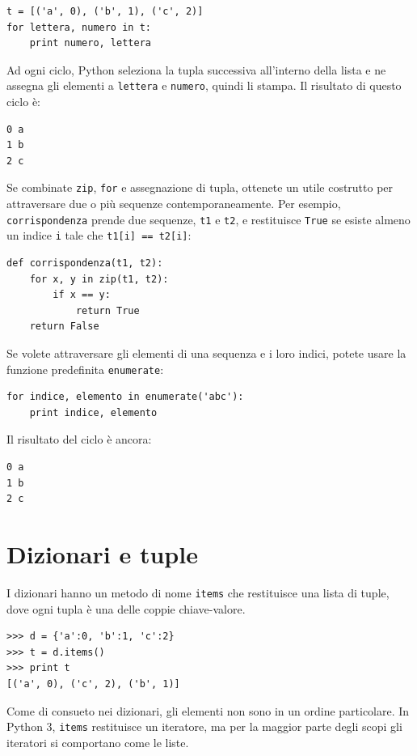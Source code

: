 \documentclass[10pt]{book}
\begin{document}
\begin{verbatim}
t = [('a', 0), ('b', 1), ('c', 2)]
for lettera, numero in t:
    print numero, lettera
\end{verbatim}
%
Ad ogni ciclo, Python seleziona la tupla successiva all'interno della lista e ne assegna gli elementi a {\tt lettera} e {\tt numero}, quindi li stampa.  Il risultato di questo ciclo è:

\begin{verbatim}
0 a
1 b
2 c
\end{verbatim}
%
Se combinate {\tt zip}, {\tt for} e assegnazione di tupla, ottenete un utile costrutto per attraversare due o più sequenze contemporaneamente. Per esempio, \verb"corrispondenza" prende due sequenze, {\tt t1} e
{\tt t2}, e restituisce {\tt True} se esiste almeno un indice {\tt i}
tale che {\tt t1[i] == t2[i]}:

\begin{verbatim}
def corrispondenza(t1, t2):
    for x, y in zip(t1, t2):
        if x == y:
            return True
    return False
\end{verbatim}
%
Se volete attraversare gli elementi di una sequenza e i loro indici, potete usare la funzione predefinita {\tt enumerate}:

\begin{verbatim}
for indice, elemento in enumerate('abc'):
    print indice, elemento
\end{verbatim}
%
Il risultato del ciclo è ancora:

\begin{verbatim}
0 a
1 b
2 c
\end{verbatim}
%



\section{Dizionari e tuple}
\label{dictuple}

I dizionari hanno un metodo di nome {\tt items} che restituisce una lista di tuple, dove ogni tupla è una delle coppie chiave-valore.

\begin{verbatim}
>>> d = {'a':0, 'b':1, 'c':2}
>>> t = d.items()
>>> print t
[('a', 0), ('c', 2), ('b', 1)]
\end{verbatim}
%
Come di consueto nei dizionari, gli elementi non sono in un ordine particolare. In Python 3, {\tt items} restituisce un iteratore, ma per la maggior parte degli scopi gli iteratori si comportano come le liste.
\end{document}
